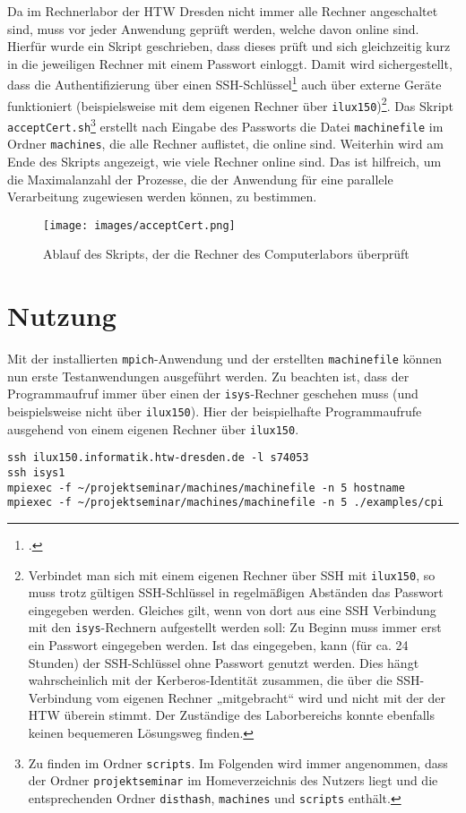 \documentclass{scrreprt}
\begin{document}
Da im Rechnerlabor der HTW Dresden nicht immer alle Rechner angeschaltet sind, muss vor jeder Anwendung geprüft werden, welche davon online sind. Hierfür wurde ein Skript geschrieben, dass dieses prüft und sich gleichzeitig kurz in die jeweiligen Rechner mit einem Passwort einloggt. Damit wird sichergestellt, dass die Authentifizierung über einen SSH-Schlüssel\footcite{schlittermann.de2014} auch über externe Geräte funktioniert (beispielsweise mit dem eigenen Rechner über \lstinline`ilux150`)\footnote{Verbindet man sich mit einem eigenen Rechner über SSH mit \lstinline`ilux150`, so muss trotz gültigen SSH-Schlüssel in regelmäßigen Abständen das Passwort eingegeben werden. Gleiches gilt, wenn von dort aus eine SSH Verbindung mit den \lstinline`isys`-Rechnern aufgestellt werden soll: Zu Beginn muss immer erst ein Passwort eingegeben werden. Ist das eingegeben, kann (für ca. 24 Stunden) der SSH-Schlüssel ohne Passwort genutzt werden. Dies hängt wahrscheinlich mit der Kerberos-Identität zusammen, die über die SSH-Verbindung vom eigenen Rechner „mitgebracht“ wird und nicht mit der der HTW überein stimmt. Der Zuständige des Laborbereichs konnte ebenfalls keinen bequemeren Lösungsweg finden.}. Das Skript \lstinline`acceptCert.sh`\footnote{Zu finden im Ordner \lstinline|scripts|. Im Folgenden wird immer angenommen, dass der Ordner \lstinline`projektseminar` im Homeverzeichnis des Nutzers liegt und die entsprechenden Ordner \lstinline`disthash`, \lstinline`machines` und \lstinline`scripts` enthält.} erstellt nach Eingabe des Passworts die Datei \lstinline`machinefile` im Ordner \lstinline`machines`, die alle Rechner auflistet, die online sind. Weiterhin wird am Ende des Skripts angezeigt, wie viele Rechner online sind. Das ist hilfreich, um die Maximalanzahl der Prozesse, die der Anwendung für eine parallele Verarbeitung zugewiesen werden können, zu bestimmen.

\begin{figure}[!ht]
\centering
\texttt{[image: images/acceptCert.png]}
\caption{Ablauf des Skripts, der die Rechner des Computerlabors überprüft}
\label{fig:acceptCert}
\end{figure}

\section{Nutzung}

Mit der installierten \lstinline`mpich`-Anwendung und der erstellten \lstinline`machinefile` können nun erste Testanwendungen ausgeführt werden. Zu beachten ist, dass der Programmaufruf immer über einen der \lstinline`isys`-Rechner geschehen muss (und beispielsweise nicht über \lstinline|ilux150|). Hier der beispielhafte Programmaufrufe ausgehend von einem eigenen Rechner über \lstinline`ilux150`.
\begin{lstlisting}
ssh ilux150.informatik.htw-dresden.de -l s74053
ssh isys1
mpiexec -f ~/projektseminar/machines/machinefile -n 5 hostname
mpiexec -f ~/projektseminar/machines/machinefile -n 5 ./examples/cpi
\end{lstlisting}
\end{document}
